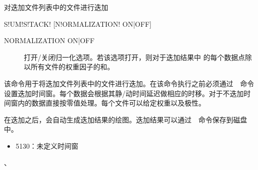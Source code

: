 \label{sss:sumstack}

对迭加文件列表中的文件进行迭加

\begin{SACSTX}
    S!UM!S!TACK! [N!ORMALIZATION! ON|OFF]
\end{SACSTX}

\begin{description}
\item [NORMALIZATION ON|OFF] 打开/关闭归一化选项。若该选项打开，则对于迭加结果中
的每个数据点除以所有文件的权重因子的和。
\end{description}

该命令用于将迭加文件列表中的文件进行迭加。在该命令执行之前必须通过~~命令设置迭加时间窗。每个数据会根据其静/动时间延迟做相应的时移。对于不迭加时间窗内的数据直接按零值处理。每个文件可以给定权重以及极性。

在迭加之后，会自动生成迭加结果的绘图。迭加结果可以通过~~命令保存到磁盘中。

\begin{itemize}
\item 5130：未定义时间窗
\end{itemize}

、
